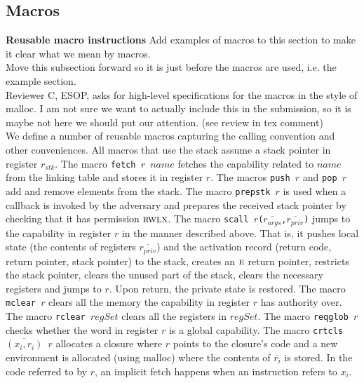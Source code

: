 \documentclass[format=acmsmall, review=false, screen=true]{acmart}
\newcommand{\var}[1]{\mathit{#1}}
\newcommand{\stk}{\var{stk}}
\newcommand{\plainperm}[1]{\textsc{#1}}
\newcommand{\entry}{\plainperm{e}}
\newcommand{\rwlx}{\plainperm{rwlx}}
\newenvironment{toplas}
    {\color{OliveGreen}
          
    }{}
\newcommand{\itoplassug}[1]
    {{\color{Blue} #1}}
\begin{document}
\begin{toplas}
\subsection{Macros}
\textbf{Reusable macro instructions} 
\label{para:macros}
\itoplassug{Add examples of macros to this section to make it clear what we mean by macros.\\}
\itoplassug{Move this subsection forward so it is just before the macros are used, i.e. the example section.\\}
\itoplassug{Reviewer C, ESOP, asks for high-level specifications for the macros in the style of malloc. I am not sure we want to actually include this in the submission, so it is maybe not here we should put our attention. (see review in tex comment)\\}
We define a number of reusable macros
capturing the calling convention and other conveniences. All macros that use the
stack assume a stack pointer in register $r_\stk$. The macro
\texttt{\footnotesize{fetch $r$ $\var{name}$}} fetches the capability related to
$\var{name}$ from the linking table and stores it in register $r$.  The macros
\texttt{\footnotesize{push $r$}} and \texttt{\footnotesize{pop $r$}} add and
remove elements from the stack. The macro \texttt{\footnotesize{prepstk $r$}} is
used when a callback is invoked by the adversary and prepares the received stack
pointer by checking that it has permission $\rwlx$.  The macro
\texttt{\footnotesize{scall
    $r$($\overline{r_{\var{args}}}$,$\overline{r_{\var{priv}}}$)}} jumps to the
capability in register $r$ in the manner described above. That is, it pushes
local state (the contents of registers $\overline{r_{\var{priv}}}$) and the
activation record (return code, return pointer, stack pointer) to the stack,
creates an $\entry$ return pointer, restricts the stack pointer, clears the
unused part of the stack, clears the necessary registers and jumps to $r$.  Upon
return, the private state is restored. The macro \texttt{\footnotesize{mclear
    $r$}} clears all the memory the capability in register $r$ has authority
over.  The macro \texttt{\footnotesize{rclear $\var{regSet}$}} clears all the
registers in $\var{regSet}$. The macro \texttt{\footnotesize{reqglob $r$}}
checks whether the word in register $r$ is a global capability. The macro
\texttt{\footnotesize{crtcls $\overline{(x_i,r_i)}$ $r$}} allocates a closure
where $r$ points to the closure's code and a new environment is allocated (using
malloc) where the contents of $\overline{r_i}$ is stored. In the code referred
to by $r$, an implicit fetch happens when an instruction refers to $x_i$.


\end{toplas}
\end{document}
